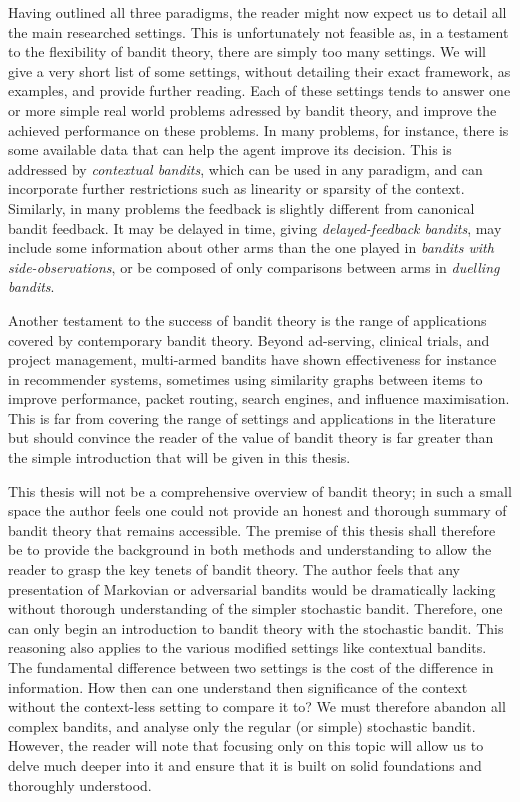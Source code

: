\par Having outlined all three paradigms, the reader might now expect us to detail all the main researched settings. This is unfortunately not feasible as, in a testament to the flexibility of bandit theory, there are simply too many settings.  We will give a very short list of some settings, without detailing their exact framework, as examples, and provide further reading. Each of these settings tends to answer one or more simple real world problems adressed by bandit theory, and improve the achieved performance on these problems. In many problems, for instance, there is some available data that can help the agent improve its decision. This is addressed\cite{banditalgs:11} by {\em contextual bandits}, which can be used in any paradigm, and can incorporate further restrictions such as linearity or sparsity of the context. Similarly, in many problems the feedback is slightly different from canonical bandit feedback. It may be delayed in time, giving {\em delayed-feedback bandits}\cite{dudik:2011}, may include some information about other arms than the one played in {\em bandits with side-observations}\cite{mannor:2011}, or be composed of only comparisons between arms in {\em duelling bandits}\cite{yue:2009}. 

\par Another testament to the success of bandit theory is the range of applications covered by contemporary bandit theory. Beyond ad-serving, clinical trials, and project management, multi-armed bandits have shown effectiveness for instance in recommender systems, sometimes using similarity graphs between items to improve performance\cite{valko:2014}, packet routing\cite{awerbuch:2004}, search engines\cite{yue:2009}, and influence maximisation\cite{vaswani:2015}.  This is far from covering the range of settings and applications in the literature but should convince the reader of the value of bandit theory is far greater than the simple introduction that will be given in this thesis. 

\par This thesis will not be a comprehensive overview of bandit theory; in such a small space the author feels one could not provide an honest and thorough summary of bandit theory that remains accessible. The premise of this thesis shall therefore be to provide the background in both methods and understanding to allow the reader to grasp the key tenets of bandit theory. The author feels that any presentation of Markovian or adversarial bandits would be dramatically lacking without thorough understanding of the simpler stochastic bandit. Therefore, one can only begin an introduction to bandit theory with the stochastic bandit. This reasoning also applies to the various modified settings like contextual bandits. The fundamental difference between two settings is the cost of the difference in information. How then can one understand then significance of the context without the context-less setting to compare it to? We must therefore abandon all complex bandits, and analyse only the regular (or simple) stochastic bandit. However, the reader will note that focusing only on this topic will allow us to delve much deeper into it and ensure that it is built on solid foundations and thoroughly understood.

